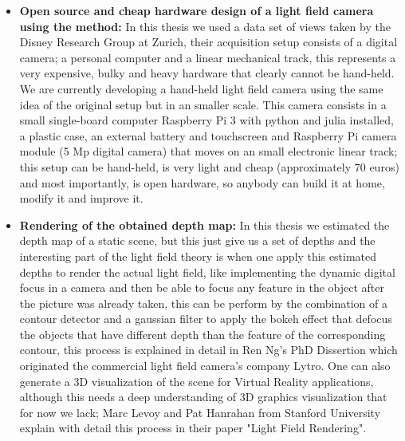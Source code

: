 \begin{itemize}
\item \textbf{Open source and cheap hardware design of a light field camera using the method:} In this thesis we used a data set of views taken by the Disney Research Group at Zurich, their acquisition setup consists of a digital camera; a personal computer and a linear mechanical track, this represents a very expensive, bulky and heavy hardware that clearly cannot be hand-held. We are currently developing a hand-held light field camera using the same idea of the original setup but in an smaller scale. This camera consists in a small single-board computer Raspberry Pi 3 with python and julia installed, a plastic case, an external battery and touchscreen and Raspberry Pi camera module (5 Mp digital camera) that moves on an small electronic linear track; this setup can be hand-held, is very light and cheap (approximately 70 euros) and most importantly, is open hardware, so anybody can build it at home, modify it and improve it. 

\item \textbf{Rendering of the obtained depth map:} In this thesis we estimated the depth map of a static scene, but this just give us a set of depths and the interesting part of the light field theory is when one apply this estimated depths to render the actual light field, like implementing the dynamic digital focus in a camera and then be able to focus any feature in the object after the picture was already taken, this can be perform by the combination of a contour detector and a gaussian filter to apply the bokeh effect that defocus the objects that have different depth than the feature of the corresponding contour, this process is explained in detail in Ren Ng's PhD Dissertion\cite{RenNg} which originated the commercial light field camera's company Lytro. One can also generate a 3D visualization of the scene for Virtual Reality applications, although this needs a deep understanding of 3D graphics visualization that for now we lack; Marc Levoy and Pat Hanrahan from Stanford University explain with detail this process in their paper "Light Field Rendering"\cite{LF-rendering}.

\end{itemize}
